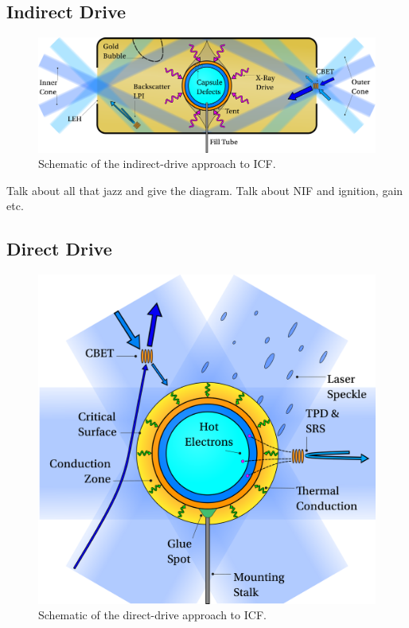 \subsection{Indirect Drive}%
\label{sec:intro_indirect}

\begin{figure}[t!]
    \includegraphics[width=\linewidth]{Introduction/Images/indirect icf white.png}
    \centering
    \caption{Schematic of the indirect-drive approach to \ac{ICF}.
    }%
    \label{fig:intro_indirect}
\end{figure}

Talk about all that jazz and give the diagram.
Talk about NIF and ignition, gain etc.

\subsection{Direct Drive}%
\label{sec:intro_direct}

\begin{figure}[t!]
    \includegraphics[width=0.7\linewidth]{Introduction/Images/direct icf white.png}
    \centering
    \caption{Schematic of the direct-drive approach to \ac{ICF}.
    }%
    \label{fig:intro_direct}
\end{figure}

